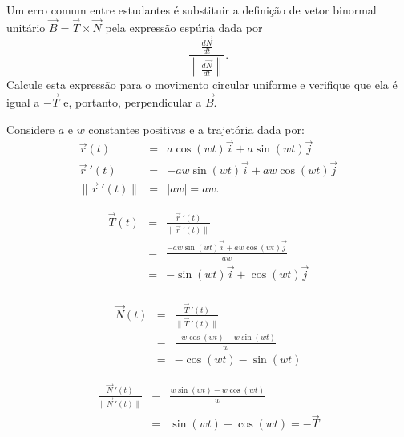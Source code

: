 \begin{exeresol}
Um erro comum entre estudantes é substituir a definição de vetor binormal unitário $\vec{B}=\vec{T}\times\vec{N}$ pela expressão espúria dada por $$\frac{\frac{d\vec{N}}{dt}}{\left\|\frac{d\vec{N}}{dt}\right\|}.$$ Calcule esta expressão para o movimento circular uniforme e verifique que ela é igual a $-\vec{T}$ e, portanto, perpendicular a $\vec{B}$.
\end{exeresol}
\begin{resol}
 Considere $a$ e $w$ constantes positivas e a trajetória dada por:
 \begin{eqnarray*}
\vec{r}(t)&=&a\cos(wt)\vec{i}+a\sin(wt)\vec{j}\\
\vec{r}~\!'(t)&=&-aw\sin(wt)\vec{i}+aw\cos(wt)\vec{j}\\
\|\vec{r}~\!'(t)\|&=&|aw|=aw.
 \end{eqnarray*}

 \begin{eqnarray*}
\vec{T}(t)&=&\frac{\vec{r}~\!'(t)}{\|\vec{r}~\!'(t)\|}\\
 &=&\frac{-aw\sin(wt)\vec{i}+aw\cos(wt)\vec{j}}{aw}\\
 &=&{-\sin(wt)\vec{i}+\cos(wt)\vec{j}}\\
 \end{eqnarray*}
 
 \begin{eqnarray*}
\vec{N}(t)&=&\frac{\vec{T}~\!'(t)}{\|\vec{T}~\!'(t)\|}\\
  &=&\frac{-w\cos(wt)-w\sin(wt)}{w}\\
  &=&{-\cos(wt)-\sin(wt)}
 \end{eqnarray*}
 
 \begin{eqnarray*}
\frac{\vec{N}~\!'(t)}{\|\vec{N}~\!'(t)\|}
  &=&\frac{w\sin(wt)-w\cos(wt)}{w}\\
  &=&{\sin(wt)-\cos(wt)}=-\vec{T}
 \end{eqnarray*}
\end{resol}

